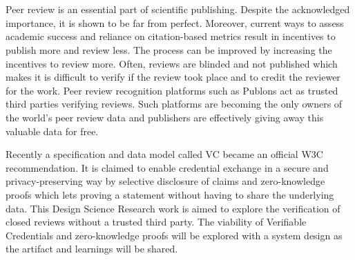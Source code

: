 \chapter{\abstractname}

Peer review is an essential part of scientific publishing. Despite the acknowledged importance, it is shown to be far from perfect. Moreover, current ways to assess academic success and reliance on citation-based metrics result in incentives to publish more and review less. The process can be improved by increasing the incentives to review more. Often, reviews are blinded and not published which makes it is difficult to verify if the review took place and to credit the reviewer for the work. Peer review recognition platforms such as Publons act as trusted third parties verifying reviews. Such platforms are becoming the only owners of the world’s peer review data and publishers are effectively giving away this valuable data for free. 

Recently a specification and data model called \acrfull{VC} became an official W3C recommendation. It is claimed to enable credential exchange in a secure and privacy-preserving way by selective disclosure of claims and zero-knowledge proofs which lets proving a statement without having to share the underlying data. This Design Science Research work is aimed to explore the verification of closed reviews without a trusted third party. The viability of Verifiable Credentials and zero-knowledge proofs will be explored with a system design as the artifact and learnings will be shared.

\makeatletter
{}
{\renewcommand{\abstractname}{Kurzfassung}}
{\renewcommand{\abstractname}{Abstract}}
\makeatother

\chapter{\abstractname}

\begin{otherlanguage}{ngerman} %

\end{otherlanguage}


\makeatletter
{}
{\renewcommand{\abstractname}{Abstract}}
{\renewcommand{\abstractname}{Kurzfassung}}
\makeatother
